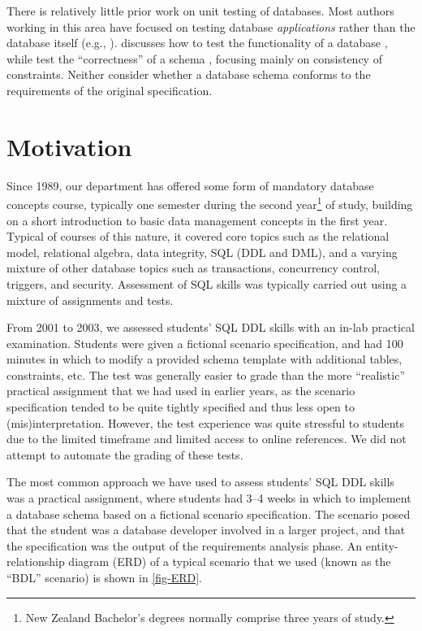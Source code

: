 \documentclass[sigconf, authordraft, capitalise]{acmart}
\begin{document}
There is relatively little prior work on unit testing of databases. Most authors working in this area have focused on testing database \emph{applications} rather than the database itself (e.g., \cite{Binnig.C-2008a-Multi-RQP,Chays.D-2008a-Query-based,Marcozzi.M-2012a-Test,Haller.K-2010a-Test}). \citeauthor{Ambler.S-2006a-Database} discusses how to test the functionality of a database \cite{Ambler.S-2006a-Database}, while \citeauthor{Farre.C-2008a-SVTe} test the ``correctness'' of a schema \cite{Farre.C-2008a-SVTe}, focusing mainly on consistency of constraints. Neither consider whether a database schema conforms to the requirements of the original specification.


\section{Motivation}
\label{sec-motivation}

Since 1989, our department has offered some form of mandatory database concepts course, typically one semester during the second year\footnote{New Zealand Bachelor's degrees normally comprise three years of study.} of study, building on a short introduction to basic data management concepts in the first year. Typical of courses of this nature, it covered core topics such as the relational model, relational algebra, data integrity, SQL (DDL and DML), and a varying mixture of other database topics such as transactions, concurrency control, triggers, and security. Assessment of SQL skills was typically carried out using a mixture of assignments and tests.

From 2001 to 2003, we assessed students' SQL DDL skills with an in-lab practical examination. Students were given a fictional scenario specification, and had 100 minutes in which to modify a provided schema template with additional tables, constraints, etc. The test was generally easier to grade than the more ``realistic'' practical assignment that we had used in earlier years, as the scenario specification tended to be quite tightly specified and thus less open to (mis)interpretation. However, the test experience was quite stressful to students due to the limited timeframe and limited access to online references. We did not attempt to automate the grading of these tests.

The most common approach we have used to assess students' SQL DDL skills was a practical assignment, where students had 3--4 weeks in which to implement a database schema based on a fictional scenario specification. The scenario posed that the student was a database developer involved in a larger project, and that the specification was the output of the requirements analysis phase. An entity-relationship diagram (ERD) of a typical scenario that we used (known as the ``BDL'' scenario) is shown in \cref{fig-ERD}.
 
\end{document}
